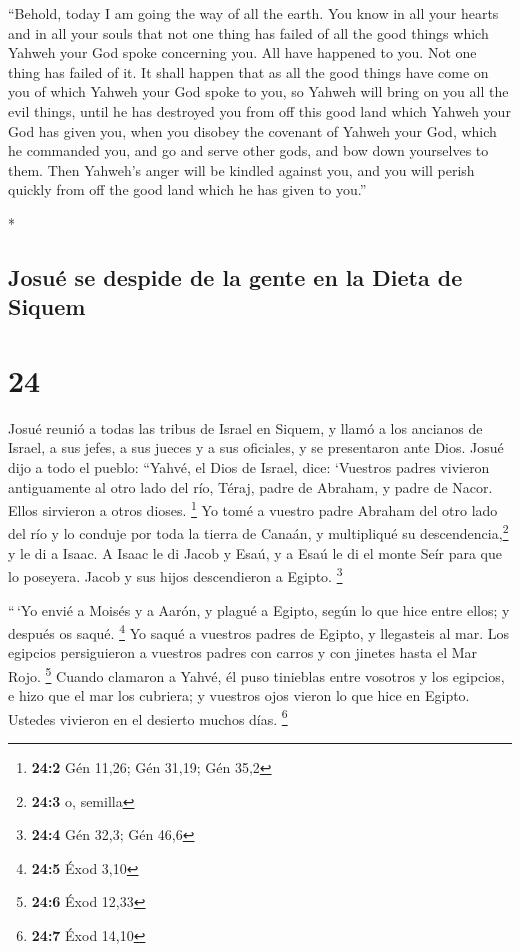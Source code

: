 \begin{paracol}{2}
\begin{otherlanguage}{english}
 ``Behold, today I am going the way of all the earth. You
know in all your hearts and in all your souls that not one thing has
failed of all the good things which Yahweh your God spoke concerning
you. All have happened to you. Not one thing has failed of it.
 It shall happen that as all the good things have come on
you of which Yahweh your God spoke to you, so Yahweh will bring on you
all the evil things, until he has destroyed you from off this good land
which Yahweh your God has given you,  when you disobey
the covenant of Yahweh your God, which he commanded you, and go and
serve other gods, and bow down yourselves to them. Then Yahweh's anger
will be kindled against you, and you will perish quickly from off the
good land which he has given to you.''

\end{otherlanguage}

\switchcolumn[0]*

\hypertarget{josuuxe9-se-despide-de-la-gente-en-la-dieta-de-siquem}{%
\subsection{Josué se despide de la gente en la Dieta de
Siquem}\label{josuuxe9-se-despide-de-la-gente-en-la-dieta-de-siquem}}

\hypertarget{section-46}{%
\section{24}\label{section-46}}

 Josué reunió a todas las tribus de Israel en Siquem, y
llamó a los ancianos de Israel, a sus jefes, a sus jueces y a sus
oficiales, y se presentaron ante Dios.  Josué dijo a todo
el pueblo: ``Yahvé, el Dios de Israel, dice: `Vuestros padres vivieron
antiguamente al otro lado del río, Téraj, padre de Abraham, y padre de
Nacor. Ellos sirvieron a otros dioses. \footnote{\textbf{24:2} Gén
  11,26; Gén 31,19; Gén 35,2}  Yo tomé a vuestro padre
Abraham del otro lado del río y lo conduje por toda la tierra de Canaán,
y multipliqué su descendencia,\footnote{\textbf{24:3} o, semilla} y le
di a Isaac.  A Isaac le di Jacob y Esaú, y a Esaú le di el
monte Seír para que lo poseyera. Jacob y sus hijos descendieron a
Egipto. \footnote{\textbf{24:4} Gén 32,3; Gén 46,6}

 ``\,`Yo envié a Moisés y a Aarón, y plagué a Egipto,
según lo que hice entre ellos; y después os saqué. \footnote{\textbf{24:5}
  Éxod 3,10}  Yo saqué a vuestros padres de Egipto, y
llegasteis al mar. Los egipcios persiguieron a vuestros padres con
carros y con jinetes hasta el Mar Rojo. \footnote{\textbf{24:6} Éxod
  12,33}  Cuando clamaron a Yahvé, él puso tinieblas entre
vosotros y los egipcios, e hizo que el mar los cubriera; y vuestros ojos
vieron lo que hice en Egipto. Ustedes vivieron en el desierto muchos
días. \footnote{\textbf{24:7} Éxod 14,10}


\end{paracol}
